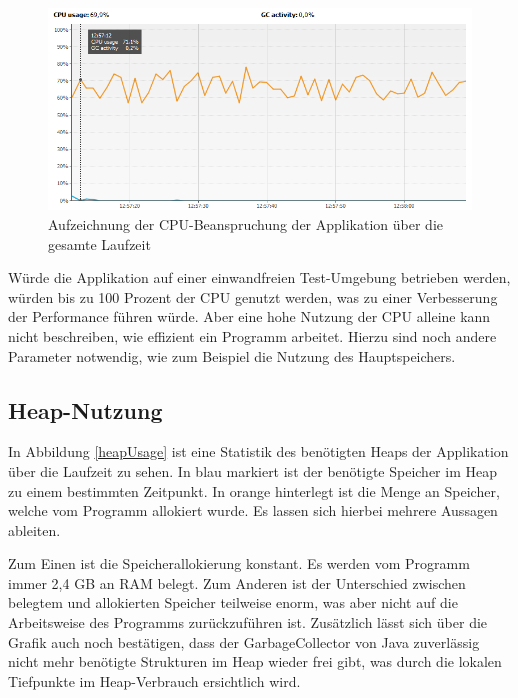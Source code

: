 \begin{figure}[h]
	\centering
	\includegraphics[width=0.9\linewidth]{images/cpuUsage.png}
	\caption{Aufzeichnung der CPU-Beanspruchung der Applikation über die gesamte Laufzeit}
	\label{cpuUsage}
\end{figure}

Würde die Applikation auf einer einwandfreien Test-Umgebung betrieben werden, würden bis zu 100 Prozent der CPU genutzt werden, was zu einer Verbesserung der Performance führen würde. Aber eine hohe Nutzung der CPU alleine kann nicht beschreiben, wie effizient ein Programm arbeitet. Hierzu sind noch andere Parameter notwendig, wie zum Beispiel die Nutzung des Hauptspeichers.

\subsection{Heap-Nutzung}
In Abbildung \ref{heapUsage} ist eine Statistik des benötigten Heaps der Applikation über die Laufzeit zu sehen. In blau markiert ist der benötigte Speicher im Heap zu einem bestimmten Zeitpunkt. In orange hinterlegt ist die Menge an Speicher, welche vom Programm allokiert wurde. Es lassen sich hierbei mehrere Aussagen ableiten. 

Zum Einen ist die Speicherallokierung konstant. Es werden vom Programm immer 2,4 GB an RAM belegt. Zum Anderen ist der Unterschied zwischen belegtem und allokierten Speicher teilweise enorm, was aber nicht auf die Arbeitsweise des Programms zurückzuführen ist. Zusätzlich lässt sich über die Grafik auch noch bestätigen, dass der GarbageCollector von Java zuverlässig nicht mehr benötigte Strukturen im Heap wieder frei gibt, was durch die lokalen Tiefpunkte im Heap-Verbrauch ersichtlich wird.

